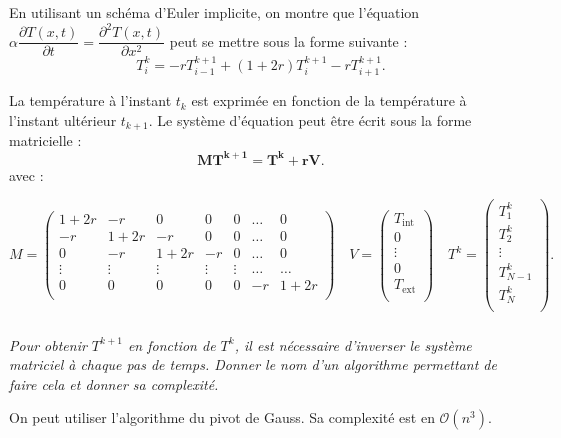 \documentclass[10pt,fleqn]{article} %
\begin{document}
\begin{multicols}{2}
\begin{multicols}{2}
En utilisant un schéma d'Euler implicite, on montre que l'équation 
$\alpha \dfrac{\partial T(x,t)}{\partial t} = \dfrac{\partial^2 T(x,t)}{\partial x^2}$
 peut se mettre sous la forme suivante : 
$$
T_i^k = -rT_{i-1}^{k+1} + \left( 1+2r\right) T_{i}^{k+1}-rT_{i+1}^{k+1}.
$$

La température à l'instant $t_k$ est exprimée en fonction de la température à l'instant 
ultérieur $t_{k+1}$.
Le système d'équation peut être écrit sous la forme matricielle : 
\begin{equation} \label{eq_implicite}
\mathbf{M T^{k+1} = T^k + rV}.
\end{equation}
avec : 

$$
M = 
\begin{pmatrix}
1+2r & -r     & 0 & 0 & 0 &  \ldots & 0 \\
-r     & 1+2r & -r & 0 & 0  & \ldots &  0 \\
0    & -r & 1+2r & -r & 0   & \ldots&  0 \\
\vdots & \vdots & \vdots & \vdots & \vdots & \ldots & \ldots \\
0& 0& 0& 0& 0& -r & 1+2r\\
\end{pmatrix}
\quad 
V = \begin{pmatrix}
T_{\text{int}} \\
0 \\
\vdots \\
0 \\
T_{\text{ext}} \\
\end{pmatrix}
\quad 
T^k = \begin{pmatrix}
T_1^k \\
T_2^k  \\
\vdots \\
T_{N-1}^k  \\
T_N^k \\
\end{pmatrix}.
$$

\fi


\subparagraph{}
\textit{Pour obtenir $T^{k+1}$ en fonction de $T^{k}$, il est nécessaire d'inverser le 
système matriciel à chaque pas de temps.
Donner le nom d'un algorithme permettant de faire cela et donner sa complexité.}

\ifprof
\begin{corrige}
On peut utiliser l'algorithme du pivot de Gauss. Sa complexité est en $\mathcal{O}(n^3)$.
\end{corrige}
\else
\fi


\end{multicols}
\end{multicols}
\end{document}
